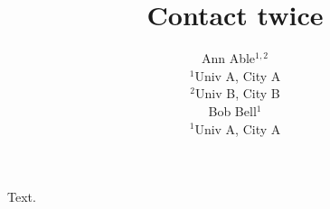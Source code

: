 \documentclass{article}
\title{Contact twice}
\author{Ann Able$^{1,2}$\\
$^{1}$Univ A, City A\\
$^{2}$Univ B, City B\\
Bob Bell$^{1}$\\
$^{1}$Univ A, City A}
\begin{document}
\maketitle
Text.
\end{document}
